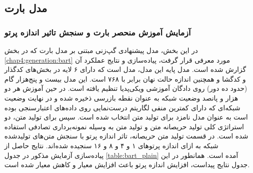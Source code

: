 \subsection{مدل بارت}

\subsubsection{آزمایش آموزش منحصر بارت و سنجش تاثیر اندازه پرتو} \label{chap5:bart:plain}
در این بخش،‌ مدل پیشنهادی گپ‌زنی مبتنی بر مدل بارت که در بخش 
\ref{chap4:generation:bart}
مورد معرفی قرار گرفت، پیاده‌سازی و نتایج عملکرد آن گزارش شده است. مدل پایه این مدل، مدل 
است که دارای ۶ لایه در بخش‌های کدگذار و کدگشا و همچنین اندازه حالت نهان برابر با ۷۶۸ است. این مدل بیست و پنج‌هزار گام (حدود ده دور) روی دادگان آموزشی ویکی‌پدیا تنظیم یافته است. 
در حین آموزش هر دو هزار و پانصد وضعیت شبکه به عنوان نقطه بازرسی ذخیره شده و در نهایت وضعیت شبکه‌ای که دارای کمترین منفی لگاریتم درست‌نمایی روی داده‌های اعتبارسنجی بوده است به عنوان مدل نامزد برای تولید متن انتخاب شده است. 
سپس برای تولید متن،‌ دو استراتژی کلی تولید حریصانه متن و تولید متن به وسیله نمونه‌برداری تصادفی استفاده شده است. در قسمت تولید متن حریصانه، تاثر اندازه پرتو با سنجش متن‌های تولید‌شده شبکه به ازای اندازه پرتو‌های ۱ و ۴ و ۸ و ۱۶ سنجیده شده‌اند. نتایج حاصل از پیاده‌سازی آزمایش مذکور در جدول 
\ref{table:bart_plain}
آمده است. همانطور در این جدول نتایج پیداست، افزایش اندازه پرتو باعث افزایش معیار
و کاهش معیار 
شده است.



